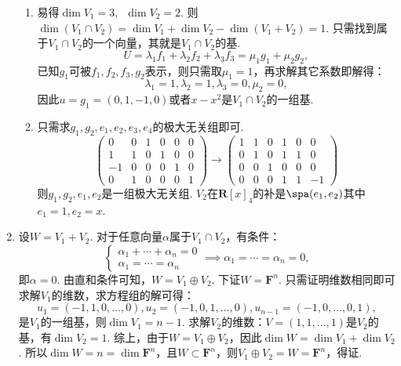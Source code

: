 \begin{enumerate}
\begin{enumerate}
              \item 易得$\dim V_1=3,\enspace \dim V_2=2$. 则$\dim (V_1\cap V_2)= \dim V_1+\dim V_2-\dim (V_1+V_2)=1$. 只需找到属于$V_1\cap V_2$的一个向量，其就是$V_1\cap V_2$的基.
                    \[U=\lambda_1f_1+\lambda_2f_2+\lambda_3f_3= \mu_1g_1+\mu_2g_2,\]
                    已知$g_1$可被$f_1,f_2,f_3,g_2$表示，则只需取$\mu_1=1$，再求解其它系数即解得：
                    \[\lambda_1=1,\lambda_2=1,\lambda_3=0,\mu_2=0,\]
                    因此$u=g_1=(0,1,-1,0)$或者$x-x^2$是$V_1\cap V_2$的一组基.

              \item 只需求$g_1,g_2,e_1,e_2,e_3,e_4$的极大无关组即可.
                    \[\begin{pmatrix}
                            0  & 0 & 1 & 0 & 0 & 0 \\
                            1  & 1 & 0 & 1 & 0 & 0 \\
                            -1 & 0 & 0 & 0 & 1 & 0 \\
                            0  & 1 & 0 & 0 & 0 & 1\end{pmatrix}\rightarrow
                        \begin{pmatrix}
                            1 & 1 & 0 & 1 & 0 & 0  \\
                            0 & 1 & 0 & 1 & 1 & 0  \\
                            0 & 0 & 1 & 0 & 0 & 0  \\
                            0 & 0 & 0 & 1 & 1 & -1\end{pmatrix}\]
                    则$g_1,g_2,e_1,e_2$是一组极大无关组. $V_2$在$\mathbf{R}[x]_4$的补是$\spa(e_1,e_2)$其中$e_1=1,e_2=x$.
          \end{enumerate}

    \item 设$W=V_1+V_2$. 对于任意向量$\alpha$属于$V_1\cap V_2$，有条件：
          \[\begin{cases}
                  \alpha_1+\cdots +\alpha_n=0 \\
                  \alpha_1= \cdots  =\alpha_n
              \end{cases}\implies \alpha_1 = \cdots = \alpha_n = 0,\]
          即$\alpha=0$. 由直和条件可知，$W=V_1\oplus V_2$. 下证$W=\mathbf{F}^n$. 只需证明维数相同即可求解$V_1$的维数，求方程组的解可得：
          \[u_1=(-1,1,0,\ldots ,0),u_2=(-1,0,1,\ldots,0),u_{n-1}=(-1,0,\ldots ,0,1),\]
          是$V_1$的一组基，则$\dim V_1=n-1$. 求解$V_2$的维数：$V= (1,1,\ldots ,1)$是$V_2$的基，有$\dim V_2=1$. 综上，由于$W=V_1\oplus V_2$，因此$\dim W=\dim V_1+\dim V_2$. 所以$\dim W=n=\dim \mathbf{F}^n$，且$W\subset \mathbf{F}^n$，则$V_1\oplus V_2=W=\mathbf{F}^n$，得证.
\end{enumerate}

